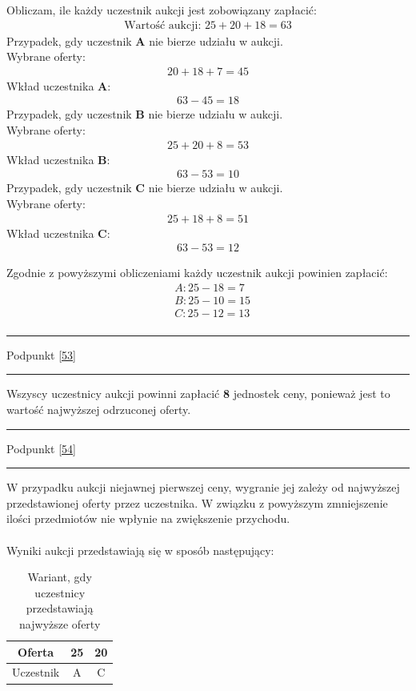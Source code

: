 \documentclass[
    12pt, %
]{../fphw}
\begin{document}
Obliczam, ile każdy uczestnik aukcji jest zobowiązany zapłacić:
\begin{align*}
    \text{Wartość aukcji: } 25 + 20 + 18 = 63
\end{align*}
Przypadek, gdy uczestnik \textbf{A} nie bierze udziału w aukcji. \\
Wybrane oferty:
\begin{align*}
    20 + 18 + 7 = 45
\end{align*}
Wkład uczestnika \textbf{A}:
\begin{align*}
    63 - 45 = 18
\end{align*}
Przypadek, gdy uczestnik \textbf{B} nie bierze udziału w aukcji. \\
Wybrane oferty:
\begin{align*}
    25 + 20 + 8 = 53
\end{align*}
Wkład uczestnika \textbf{B}:
\begin{align*}
    63 - 53 = 10
\end{align*}
Przypadek, gdy uczestnik \textbf{C} nie bierze udziału w aukcji. \\
Wybrane oferty:
\begin{align*}
    25 + 18 + 8 = 51
\end{align*}
Wkład uczestnika \textbf{C}:
\begin{align*}
    63 - 53 = 12
\end{align*}

Zgodnie z powyższymi obliczeniami każdy uczestnik aukcji powinien zapłacić:
\begin{align*}
     & A: 25 -  18 = 7  \\
     & B: 25 -  10 = 15 \\
     & C: 25 -  12 = 13 \\
\end{align*}
\par\noindent\rule{\textwidth}{0.4pt}
Podpunkt \ref{53}
\par\noindent\rule{\textwidth}{0.4pt}
Wszyscy uczestnicy aukcji powinni zapłacić \textbf{8} jednostek ceny,
ponieważ jest to wartość najwyższej odrzuconej oferty.
\par\noindent\rule{\textwidth}{0.4pt}
Podpunkt \ref{54}
\par\noindent\rule{\textwidth}{0.4pt}
W przypadku aukcji niejawnej pierwszej ceny, wygranie jej zależy od najwyższej
przedstawionej oferty przez uczestnika.
W związku z powyższym zmniejszenie ilości przedmiotów nie wpłynie na zwiększenie przychodu.
\\ \\
Wyniki aukcji przedstawiają się w sposób następujący: \\
\begin{table}[H]
    \centering
    \begin{tabular}{ | c | c | c |}
        \hline
        Oferta    & 25 & 20 \\
        \hline
        Uczestnik & A  & C  \\
        \hline
    \end{tabular}
    \caption{Wariant, gdy uczestnicy przedstawiają najwyższe oferty}
\end{table}
\end{document}
